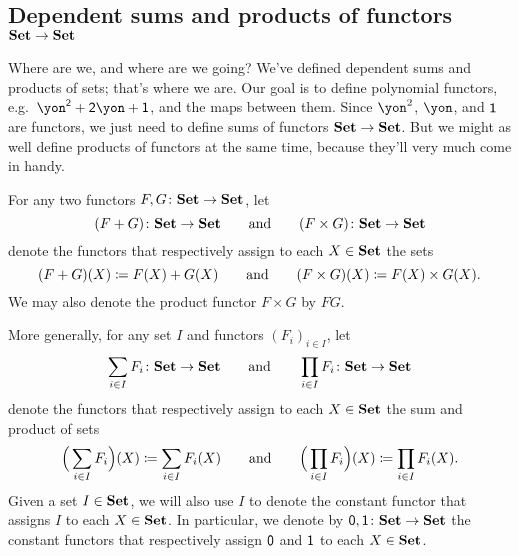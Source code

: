 \documentclass[Book-Poly]{subfiles}
\begin{document}
\subsection{Dependent sums and products of functors $\mathbf{Set}\to\mathbf{Set}$} \label{subsec.poly.func_nat.repr_sum.dep_sum_prod_func}

Where are we, and where are we going? We've defined dependent sums and products of sets; that's where we are. Our goal is to define polynomial functors, e.g.\ $\yon^\2+\2\yon+\1$, and the maps between them. Since $\yon^2$, $\yon$, and $\textsf{1}$ are functors, we just need to define sums of functors $\mathbf{Set}\to\mathbf{Set}$. But we might as well define products of functors at the same time, because they'll very much come in handy.

\begin{definition}\label{def.sum_prod}
For any two functors $F,G\colon\mathbf{Set}\to\mathbf{Set}$, let
\[
  (F+G)\colon\mathbf{Set}\to\mathbf{Set}
  \qquad\text{and}\qquad
  (F\times G)\colon\mathbf{Set}\to\mathbf{Set}
\]
denote the functors that respectively assign to each $X\in\mathbf{Set}$ the sets
\[
  (F+G)(X)\coloneqq F(X)+G(X)
  \qquad\text{and}\qquad
	(F\times G)(X)\coloneqq F(X)\times G(X).
\]
We may also denote the product functor $F \times G$ by $FG$.

More generally, for any set $I$ and functors $(F_i)_{i\in I}$, let
\[
\sum_{i\in I}F_i\colon\mathbf{Set}\to\mathbf{Set}
\qquad\text{and}\qquad
\prod_{i\in I}F_i\colon\mathbf{Set}\to\mathbf{Set}
\]
denote the functors that respectively assign to each $X\in\mathbf{Set}$ the sum and product of sets
\[
	\Big(\sum_{i\in I}F_i\Big)(X)\coloneqq\sum_{i\in I} F_i(X)
	\qquad\text{and}\qquad
	\Big(\prod_{i\in I}F_i\Big)(X)\coloneqq\prod_{i\in I} F_i(X).
\]
Given a set $I\in\mathbf{Set}$, we will also use $I$ to denote the constant functor that assigns $I$ to each $X\in\mathbf{Set}$.
In particular, we denote by $\textsf{0},\textsf{1}\colon\mathbf{Set}\to\mathbf{Set}$ the constant functors that respectively assign $\textsf{0}$ and $\textsf{1}$ to each $X\in\mathbf{Set}$.
\end{definition}
\end{document}
